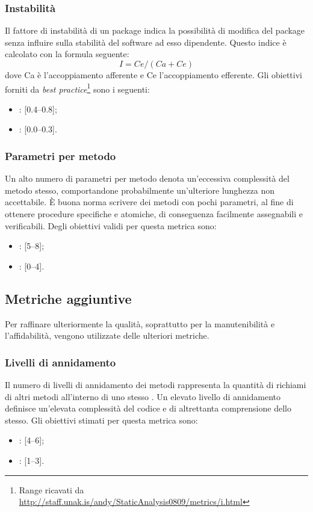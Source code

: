 \subsubsection{Instabilità}
\label{4.2.8}
Il fattore di instabilità di un package indica la possibilità di modifica del package senza influire sulla stabilità del software ad esso dipendente.
Questo indice è calcolato con la formula seguente:
$$I = Ce / (Ca + Ce)$$
dove Ca è l'accoppiamento afferente e Ce l'accoppiamento efferente.
Gli obiettivi forniti da \emph{best practice}\footnote{Range ricavati da \url{http://staff.unak.is/andy/StaticAnalysis0809/metrics/i.html}} sono i seguenti:
\begin{itemize}
\item {}: [0.4--0.8];
\item {}: [0.0--0.3].
\end{itemize}

\subsubsection{Parametri per metodo}
Un alto numero di parametri per metodo denota un'eccessiva complessità del metodo stesso, comportandone probabilmente un'ulteriore lunghezza non accettabile. \`{E} buona norma scrivere dei metodi con pochi parametri, al fine di ottenere procedure specifiche e atomiche, di conseguenza facilmente assegnabili e verificabili.
Degli obiettivi validi per questa metrica sono:
\begin{itemize}
\item {}: [5--8];
\item {}: [0--4].
\end{itemize}

\subsection{Metriche aggiuntive}
Per raffinare ulteriormente la qualità, soprattutto per la manutenibilità e l'affidabilità, vengono utilizzate delle ulteriori metriche.

\subsubsection{Livelli di annidamento}
\label{4.2.2}
Il numero di livelli di annidamento dei metodi rappresenta la quantità di richiami di altri metodi all'interno di uno stesso .
Un elevato livello di annidamento definisce un'elevata complessità del codice e di altrettanta comprensione dello stesso.
Gli obiettivi stimati per questa metrica sono:
\begin{itemize}
\item {}: [4--6];
\item {}: [1--3].
\end{itemize}

